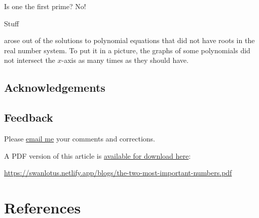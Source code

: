 \documentclass[
  a4paper,
]{article}
\begin{document}
Is one the first prime? No!

Stuff

arose out of the solutions to polynomial equations that did not have
roots in the real number system. To put it in a picture, the graphs of
some polynomials did not intersect the \(x\)-axis as many times as they
should have.

\hypertarget{acknowledgements}{%
\subsection{Acknowledgements}\label{acknowledgements}}

\hypertarget{feedback}{%
\subsection{Feedback}\label{feedback}}

Please \href{mailto:feedback.swanlotus@gmail.com}{email me} your
comments and corrections.

\noindent A PDF version of this article is
\href{./the-two-most-important-numbers.pdf}{available for download
here}:

\begin{small}

\begin{sffamily}

\url{https://swanlotus.netlify.app/blogs/the-two-most-important-numbers.pdf}

\end{sffamily}

\end{small}

\hypertarget{bibliography}{%
\section*{References}\label{bibliography}}
\end{document}
